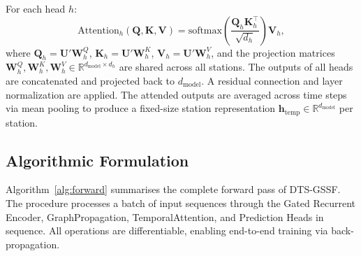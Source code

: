 For each head $h$:
\begin{equation}
    \text{Attention}_h(\mathbf{Q}, \mathbf{K}, \mathbf{V}) = \text{softmax}\left(\frac{\mathbf{Q}_h \mathbf{K}_h^\top}{\sqrt{d_h}}\right) \mathbf{V}_h,
    \label{eq:attention}
\end{equation}
where $\mathbf{Q}_h = \mathbf{U}' \mathbf{W}_h^Q$, $\mathbf{K}_h = \mathbf{U}' \mathbf{W}_h^K$, $\mathbf{V}_h = \mathbf{U}' \mathbf{W}_h^V$, and the projection matrices $\mathbf{W}_h^Q, \mathbf{W}_h^K, \mathbf{W}_h^V \in \mathbb{R}^{d_{\text{model}} \times d_h}$ are shared across all stations. The outputs of all heads are concatenated and projected back to $d_{\text{model}}$. A residual connection and layer normalization \cite{ba2016layernorm} are applied. The attended outputs are averaged across time steps via mean pooling to produce a fixed-size station representation $\mathbf{h}_{\text{temp}} \in \mathbb{R}^{d_{\text{model}}}$ per station.

\subsection{Algorithmic Formulation}

Algorithm~\ref{alg:forward} summarises the complete forward pass of DTS-GSSF. The procedure processes a batch of input sequences through the Gated Recurrent Encoder, GraphPropagation, TemporalAttention, and Prediction Heads in sequence. All operations are differentiable, enabling end-to-end training via back-propagation.

